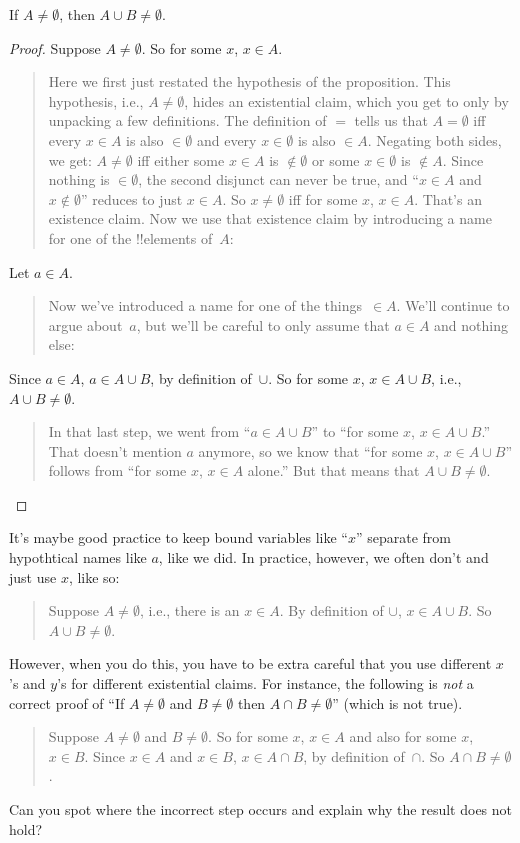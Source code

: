 \documentclass[../../../include/open-logic-section]{subfiles}
\begin{document}
\begin{prop}
If $A \neq \emptyset$, then $A \cup B \neq \emptyset$.
\end{prop}

\begin{proof}
  Suppose $A \neq \emptyset$. So for some $x$, $x \in A$. 
  \begin{quote}
    Here we first just restated the hypothesis of the
    proposition. This hypothesis, i.e., $A \neq \emptyset$, hides an
    existential claim, which you get to only by unpacking a few
    definitions. The definition of $=$ tells us that $A = \emptyset$
    iff every $x \in A$ is also $\in \emptyset$ and every $x \in
    \emptyset$ is also $\in A$. Negating both sides, we get: $A \neq
    \emptyset$ iff either some $x \in A$ is $\notin \emptyset$ or some
    $x \in \emptyset$ is $\notin A$. Since nothing is $\in \emptyset$,
    the second disjunct can never be true, and ``$x \in A$ and $x
    \notin \emptyset$'' reduces to just $x \in A$. So $x \neq
    \emptyset$ iff for some $x$, $x \in A$. That's an existence
    claim. Now we use that existence claim by introducing a name for
    one of the !!{element}s of~$A$:
  \end{quote}
  Let $a \in A$.
  \begin{quote}
    Now we've introduced a name for one of the things~$\in A$. We'll
    continue to argue about~$a$, but we'll be careful to only assume
    that $a \in A$ and nothing else:
  \end{quote}
  Since $a \in A$, $a \in A \cup B$, by definition of~$\cup$. So for
  some $x$, $x \in A \cup B$, i.e., $A \cup B \neq \emptyset$.
  \begin{quote}
    In that last step, we went from ``$a \in A \cup B$'' to ``for some
    $x$, $x \in A \cup B$.'' That doesn't mention $a$ anymore, so we
    know that ``for some $x$, $x \in A \cup B$'' follows from ``for
    some $x$, $x \in A$ alone.'' But that means that $A \cup B \neq
    \emptyset$.
  \end{quote}
\end{proof}

It's maybe good practice to keep bound variables like ``$x$'' separate
from hypothtical names like $a$, like we did. In practice, however, we
often don't and just use $x$, like so:
\begin{quote}
Suppose $A \neq \emptyset$, i.e., there is an $x \in A$. By definition
of $\cup$, $x \in A \cup B$. So $A \cup B \neq \emptyset$.
\end{quote}
However, when you do this, you have to be extra careful that you use
different $x$'s and $y$'s for different existential claims. For
instance, the following is \emph{not} a correct proof of ``If $A \neq
\emptyset$ and $B \neq \emptyset$ then $A \cap B \neq \emptyset$''
(which is not true).
\begin{quote}
Suppose $A \neq \emptyset$ and $B \neq \emptyset$. So for some $x$, $x
\in A$ and also for some $x$, $x \in B$. Since $x \in A$ and $x \in
B$, $x \in A \cap B$, by definition of~$\cap$. So $A \cap B \neq
\emptyset$.
\end{quote}
Can you spot where the incorrect step occurs and explain why the
result does not hold?
\end{document}
